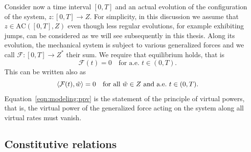 \documentclass[a4paper,10pt,twoside]{amsbook}
\numberwithin{section}{chapter}
\numberwithin{equation}{chapter}
\theoremstyle{definition}
\DeclarePairedDelimiter{\dual}{\langle}{\rangle}
\begin{document}
Consider now a time interval $[0,T]$ and an actual evolution of the configuration of the system, $z\colon[0,T]\to Z$. For simplicity, in this discussion we assume that $z\in\text{AC}([0,T],Z)$ even though less regular evolutions, for example exhibiting jumps, can be considered as we will see subsequently in this thesis. Along its evolution, the mechanical system is subject to various generalized forces and we call $\mathcal{F}\colon[0,T]\to Z^*$ their sum. We require that equilibrium holds, that is
\[
\mathcal{F}(t)=0\quad\text{for a.e.\ $t\in(0,T)$}.
\]
This can be written also as
\begin{equation}
\label{eqn:modeling:ppv}
\dual{\mathcal{F}(t),\tilde{w}}=0\quad\text{for all $\tilde w\in Z$ and a.e.\ $t\in(0,T)$}.
\end{equation}
Equation~\eqref{eqn:modeling:ppv} is the statement of the principle of virtual powers, that is, the virtual power of the generalized force acting on the system along all virtual rates must vanish.

\subsection{Constitutive relations}
\end{document}
